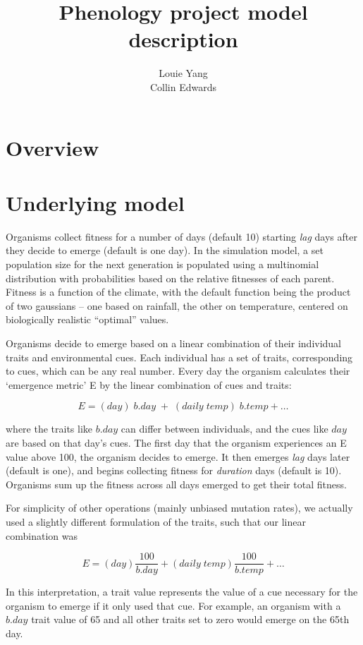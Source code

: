 \documentclass[11pt,a4paper]{article}
\author{Louie Yang \\ Collin Edwards}
\title{Phenology project model description}
\begin{document}
\maketitle
\section{Overview}
\section{Underlying model}
Organisms collect fitness for a number of days (default 10) starting \textit{lag} days after they decide to emerge (default is one day). In the simulation model, a set population size for the next generation is populated using a multinomial distribution with probabilities based on the relative fitnesses of each parent. Fitness is a function of the climate, with the default function being the product of two gaussians -- one based on rainfall, the other on temperature, centered on biologically realistic ``optimal'' values.

Organisms decide to emerge based on a linear combination of their individual traits and environmental cues. Each individual has a set of traits, corresponding to cues, which can be any real number. Every day the organism calculates their `emergence metric' E by the linear combination of cues and traits:

\[E = (day)\;b.day\; + \;(daily\; temp)\;b.temp+\dots\] 

where the traits like $b.day$ can differ between individuals, and the cues like $day$ are based on that day's cues. The first day that the organism experiences an E value above 100, the organism decides to emerge. It then emerges \textit{lag} days later (default is one), and begins collecting fitness for \textit{duration} days (default is 10). Organisms sum up the fitness across all days emerged to get their total fitness. 

For simplicity of other operations (mainly unbiased mutation rates), we actually used a slightly different formulation of the traits, such that our linear combination was

\[E = (day)\frac{100}{b.day} + (daily\; temp)\frac{100}{b.temp}+\dots\] 

In this interpretation, a trait value represents the value of a cue necessary for the organism to emerge if it only used that cue. For example, an organism with a $b.day$ trait value of 65 and all other traits set to zero would emerge on the 65th day.
\end{document}
